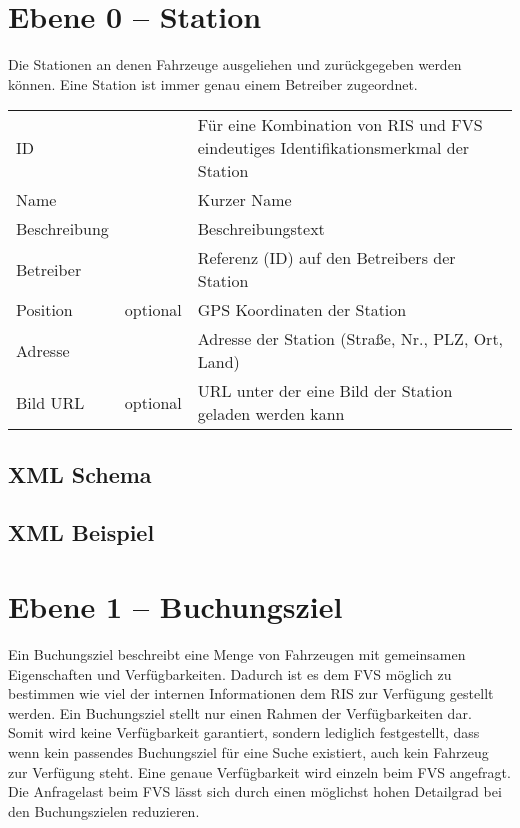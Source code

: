 \section{Ebene 0 -- Station}
Die Stationen an denen Fahrzeuge ausgeliehen und zurückgegeben werden können. Eine Station ist immer genau einem Betreiber zugeordnet.

\begin{flushleft}
\begin{tabularx}{\linewidth}{l>{\raggedright\arraybackslash}l>{\raggedright\arraybackslash}X} 
\toprule
ID & & Für eine Kombination von RIS und FVS eindeutiges Identifikationsmerkmal der Station \\
Name & & Kurzer Name \\
Beschreibung & & Beschreibungstext \\
Betreiber & & Referenz (ID) auf den Betreibers der Station \\
Position & optional & GPS Koordinaten der Station \\
Adresse & & Adresse der Station (Straße, Nr., PLZ, Ort, Land) \\
Bild URL & optional & URL unter der eine Bild der Station geladen werden kann \\
\bottomrule
\end{tabularx}
\end{flushleft}

\subsection{XML Schema}
\begin{minipage}{\textwidth}

\end{minipage}

\subsection{XML Beispiel}

\section{Ebene 1 -- Buchungsziel}
Ein Buchungsziel beschreibt eine Menge von Fahrzeugen mit gemeinsamen Eigenschaften und Verfügbarkeiten. Dadurch ist es dem FVS möglich zu bestimmen wie viel der internen Informationen dem RIS zur Verfügung gestellt werden. Ein Buchungsziel stellt nur einen Rahmen der Verfügbarkeiten dar. Somit wird keine Verfügbarkeit garantiert, sondern lediglich festgestellt, dass wenn kein passendes Buchungsziel für eine Suche existiert, auch kein Fahrzeug zur Verfügung steht. Eine genaue Verfügbarkeit wird einzeln beim FVS angefragt. Die Anfragelast beim FVS lässt sich durch einen möglichst hohen Detailgrad bei den Buchungszielen reduzieren.

